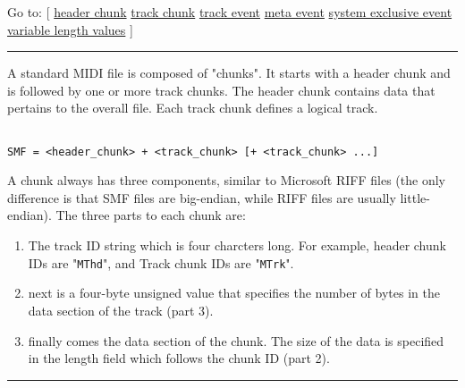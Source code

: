 \providecommand{\tightlist}{%
  \setlength{\itemsep}{0pt}\setlength{\parskip}{0pt}}
\renewcommand{\thesubsection}{}



Go to: {[} \protect\hyperlink{header_chunk}{header chunk} \textbar{}
\protect\hyperlink{track_chunk}{track chunk} \textbar{}
\protect\hyperlink{track_event}{track event} \textbar{}
\protect\hyperlink{meta_event}{meta event} \textbar{}
\protect\hyperlink{sysex_event}{system exclusive event} \textbar{}
\protect\hyperlink{variable_length}{variable length values} {]}

\begin{center}\rule{0.5\linewidth}{0.5pt}\end{center}

A standard MIDI file is composed of "chunks". It starts with a header
chunk and is followed by one or more track chunks. The header chunk
contains data that pertains to the overall file. Each track chunk
defines a logical track.

\begin{verbatim}
 
SMF = <header_chunk> + <track_chunk> [+ <track_chunk> ...]
\end{verbatim}

A chunk always has three components, similar to Microsoft RIFF files
(the only difference is that SMF files are big-endian, while RIFF files
are usually little-endian). The three parts to each chunk are:

\begin{enumerate}
\tightlist
\item
  The track ID string which is four charcters long. For example, header
  chunk IDs are "\texttt{MThd}", and Track chunk IDs are
  "\texttt{MTrk}".
\item
  next is a four-byte unsigned value that specifies the number of bytes
  in the data section of the track (part 3).
\item
  finally comes the data section of the chunk. The size of the data is
  specified in the length field which follows the chunk ID (part 2).
\end{enumerate}

\begin{center}\rule{0.5\linewidth}{0.5pt}\end{center}

